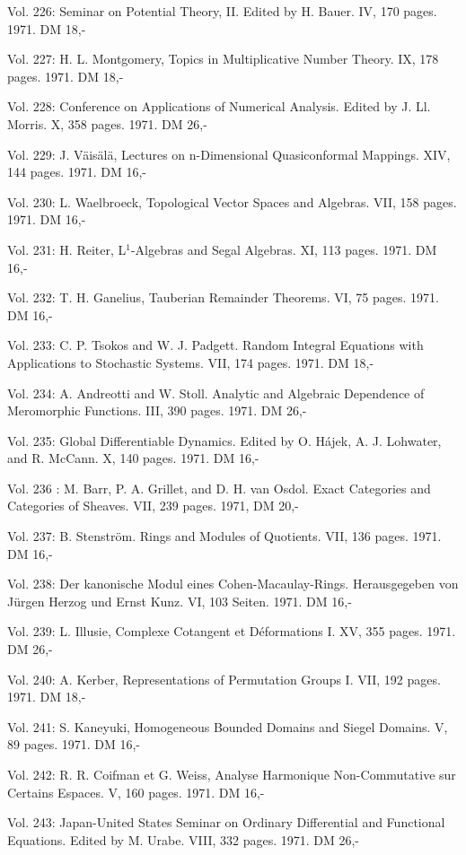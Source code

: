 Vol. 226: Seminar on Potential Theory, II. Edited by H. Bauer. IV, 170 pages. 1971. DM 18,-

Vol. 227: H. L. Montgomery, Topics in Multiplicative Number Theory. IX, 178 pages. 1971. DM 18,-

Vol. 228: Conference on Applications of Numerical Analysis. Edited by J. Ll. Morris. X, 358 pages. 1971. DM 26,-

Vol. 229: J. Väisälä, Lectures on n-Dimensional Quasiconformal Mappings. XIV, 144 pages. 1971. DM 16,-

Vol. 230: L. Waelbroeck, Topological Vector Spaces and Algebras. VII, 158 pages. 1971. DM 16,-

Vol. 231: H. Reiter, L$^1$-Algebras and Segal Algebras. XI, 113 pages. 1971. DM 16,-

Vol. 232: T. H. Ganelius, Tauberian Remainder Theorems. VI, 75 pages. 1971. DM 16,-

Vol. 233: C. P. Tsokos and W. J. Padgett. Random Integral Equations with Applications to Stochastic Systems. VII, 174 pages. 1971. DM 18,-

Vol. 234: A. Andreotti and W. Stoll. Analytic and Algebraic Dependence of Meromorphic Functions. III, 390 pages. 1971. DM 26,-

Vol. 235: Global Differentiable Dynamics. Edited by O. Hájek, A. J. Lohwater, and R. McCann. X, 140 pages. 1971. DM 16,-

Vol. 236 : M. Barr, P. A. Grillet, and D. H. van Osdol. Exact Categories and Categories of Sheaves. VII, 239 pages. 1971, DM 20,-

Vol. 237: B. Stenström. Rings and Modules of Quotients. VII, 136 pages. 1971. DM 16,-

Vol. 238: Der kanonische Modul eines Cohen-Macaulay-Rings. Herausgegeben von Jürgen Herzog und Ernst Kunz. VI, 103 Seiten. 1971. DM 16,-

Vol. 239: L. Illusie, Complexe Cotangent et Déformations I. XV, 355 pages. 1971. DM 26,-

Vol. 240: A. Kerber, Representations of Permutation Groups I. VII, 192 pages. 1971. DM 18,-

Vol. 241: S. Kaneyuki, Homogeneous Bounded Domains and Siegel Domains. V, 89 pages. 1971. DM 16,-

Vol. 242: R. R. Coifman et G. Weiss, Analyse Harmonique Non-Commutative sur Certains Espaces. V, 160 pages. 1971. DM 16,-

Vol. 243: Japan-United States Seminar on Ordinary Differential and Functional Equations. Edited by M. Urabe. VIII, 332 pages. 1971. DM 26,-

